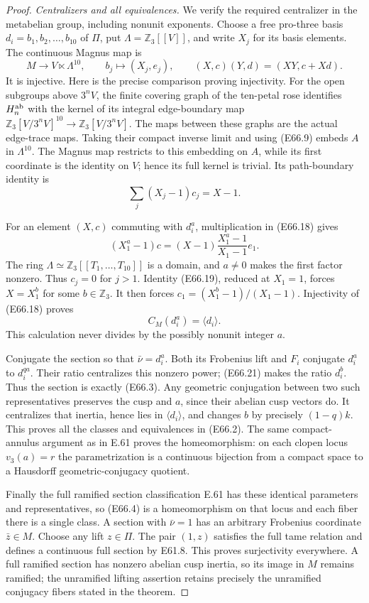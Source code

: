 \begin{proof}
\emph{Centralizers and all equivalences.}
We verify the required centralizer in the metabelian group,
including nonunit exponents. Choose a free pro-three basis
$d_i=b_1,b_2,\ldots,b_{10}$ of $\Pi$, put
$\Lambda=\mathbb Z_3[[V]]$, and write $X_j$ for its basis
elements. The continuous Magnus map is
\[
 M\longrightarrow V\ltimes\Lambda^{10},\qquad
 b_j\longmapsto(X_j,e_j),
 \qquad (X,c)(Y,d)=(XY,c+Xd).
 \tag{E66.18}
\]
It is injective. Here is the precise comparison proving
injectivity. For the open subgroups above $3^nV$, the
finite covering graph of the ten-petal rose identifies
$H_n^{\rm ab}$ with the kernel of its integral edge-boundary
map
$\mathbb Z_3[V/3^nV]^{10}\to\mathbb Z_3[V/3^nV]$.
The maps between these graphs are the actual edge-trace
maps. Taking their compact inverse limit and using
(E66.9) embeds $A$ in $\Lambda^{10}$. The Magnus map
restricts to this embedding on $A$, while its first
coordinate is the identity on $V$; hence its full kernel
is trivial. Its path-boundary identity is
\[
                 \sum_j(X_j-1)c_j=X-1 .
 \tag{E66.19}
\]

For an element $(X,c)$ commuting with $d_i^a$, multiplication
in (E66.18) gives
\[
 (X_1^a-1)c=(X-1)
       \frac{X_1^a-1}{X_1-1}e_1 .
 \tag{E66.20}
\]
The ring $\Lambda\simeq\mathbb Z_3[[T_1,\ldots,T_{10}]]$
is a domain, and $a\ne0$ makes the first factor nonzero.
Thus $c_j=0$ for $j>1$. Identity (E66.19), reduced at
$X_1=1$, forces $X=X_1^b$ for some $b\in\mathbb Z_3$.
It then forces $c_1=(X_1^b-1)/(X_1-1)$.
Injectivity of (E66.18) proves
\[
                         C_M(d_i^a)=\langle d_i\rangle.
 \tag{E66.21}
\]
This calculation never divides by the possibly nonunit
integer $a$.

Conjugate the section so that $\bar\nu=d_i^a$.
Both its Frobenius lift and $F_i$ conjugate $d_i^a$ to
$d_i^{qa}$. Their ratio centralizes this nonzero power;
(E66.21) makes the ratio $d_i^b$. Thus the section is
exactly (E66.3). Any geometric conjugation between two
such representatives preserves the cusp and $a$, since
their abelian cusp vectors do. It centralizes that
inertia, hence lies in $\langle d_i\rangle$, and changes
$b$ by precisely $(1-q)k$. This proves all the classes
and equivalences in (E66.2).
The same compact-annulus argument as in E.61 proves the
homeomorphism: on each clopen locus $v_3(a)=r$ the
parametrization is a continuous bijection from a compact
space to a Hausdorff geometric-conjugacy quotient.

Finally the full ramified section classification E.61
has these identical parameters and representatives, so
(E66.4) is a homeomorphism on that locus and each fiber
there is a single class. A section with $\bar\nu=1$ has
an arbitrary Frobenius coordinate $\bar z\in M$.
Choose any lift $z\in\Pi$. The pair $(1,z)$ satisfies
the full tame relation and defines a continuous full
section by E61.8. This proves surjectivity everywhere.
A full ramified section has nonzero abelian cusp inertia,
so its image in $M$ remains ramified; the unramified
lifting assertion retains precisely the unramified
conjugacy fibers stated in the theorem.
\end{proof}
